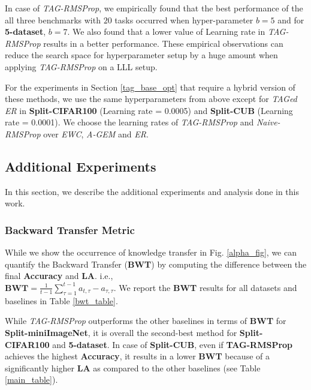 \documentclass{article} \usepackage{collas2022_conference,times}
\begin{document}
In case of \textit{TAG-RMSProp}, we empirically found that the best performance of the all three benchmarks with $20$ tasks occurred when hyper-parameter $b=5$ and for \textbf{5-dataset}, $b=7$. We also found that a lower value of Learning rate in \textit{TAG-RMSProp} results in a better performance. These empirical observations can reduce the search space for hyperparameter setup by a huge amount when applying \textit{TAG-RMSProp} on a LLL setup. 

For the experiments in Section \ref{tag_base_opt} that require a hybrid version of these methods, we use the same hyperparameters from above except for \textit{TAGed ER} in \textbf{Split-CIFAR100} (Learning rate = 0.0005) and \textbf{Split-CUB} (Learning rate = 0.0001). We choose the learning rates of \textit{TAG-RMSProp} and \textit{Naive-RMSProp} over \textit{EWC}, \textit{A-GEM} and \textit{ER}.


\subsection{Additional Experiments}\label{more_exp}
In this section, we describe the additional experiments and analysis done in this work. 

\subsubsection{Backward Transfer Metric}
While we show the occurrence of knowledge transfer in Fig. \ref{alpha_fig}, we can quantify the Backward Transfer (\textbf{BWT}) \citep{chaudhry2019tiny} by computing the difference between the final \textbf{Accuracy} and \textbf{LA}. i.e., \\ $\textbf{BWT} = \frac{1}{t-1}\sum_{\tau=1}^{t-1} a_{t,\tau} - a_{\tau,\tau}$. We report the \textbf{BWT} results for all datasets and baselines in Table \ref{bwt_table}. 

While \textit{TAG-RMSProp} outperforms the other baselines in terms of \textbf{BWT} for \textbf{Split-miniImageNet}, it is overall the second-best method for \textbf{Split-CIFAR100} and \textbf{5-dataset}. In case of \textbf{Split-CUB}, even if \textbf{TAG-RMSProp} achieves the highest \textbf{Accuracy}, it results in a lower \textbf{BWT} because of a significantly higher \textbf{LA} as compared to the other baselines (see Table \ref{main_table}). 
\end{document}
